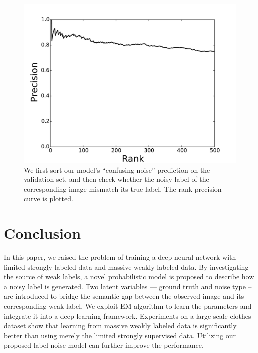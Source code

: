 \documentclass[10pt,twocolumn,letterpaper]{article}
\begin{document}
\begin{figure}[t]
\begin{center}
\includegraphics[width=0.8\linewidth]{figure/noise_prediction_rank_precision.pdf}
\end{center}
\caption{We first sort our model's ``confusing noise'' prediction on the validation set, and then check whether the noisy label of the corresponding image mismatch its true label. The rank-precision curve is plotted.}
\label{fig:noise_prediction_rp}
\end{figure}

\section{Conclusion} %
\label{sec:conclusion}
In this paper, we raised the problem of training a deep neural network with limited strongly labeled data and massive weakly labeled data. By investigating the source of weak labels, a novel probabilistic model is proposed to describe how a noisy label is generated. Two latent variables --- ground truth and noise type -- are introduced to bridge the semantic gap between the observed image and its corresponding weak label. We exploit EM algorithm to learn the parameters and integrate it into a deep learning framework. Experiments on a large-scale clothes dataset show that learning from massive weakly labeled data is significantly better than using merely the limited strongly supervised data. Utilizing our proposed label noise model can further improve the performance.

{\small


}
\end{document}

